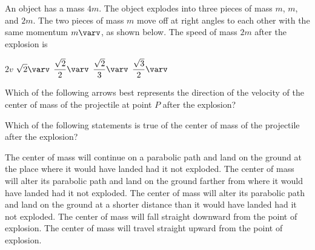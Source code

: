 \documentclass{../../oss-apphys-exam}
\begin{document}
\begin{multicols*}{2}
\begin{questions}
    \question An object has a mass $4m$. The object explodes into three pieces
    of mass $m$, $m$, and $2m$. The two pieces of mass $m$ move off at right
    angles to each other with the same momentum $m\varv$, as shown below. The
    speed of mass $2m$ after the explosion is
    \begin{center}
    \end{center}
    \vspace{-.2in}
    \begin{choices}
      \choice $2v$
      \choice $\displaystyle\sqrt{2}\varv$
      \choice $\dfrac{\sqrt{2}}{2}\varv$
      \choice $\dfrac{\sqrt{2}}{3}\varv$
      \choice $\dfrac{\sqrt{3}}{2}\varv$
    \end{choices}
    

    \question Which of the following arrows best represents the direction of the
    velocity of the center of mass of the projectile at point $P$ after the
    explosion?
    \label{cm1}
    \begin{choices}
      \choice{\LARGE$\leftarrow$}
      \choice{\LARGE$\swarrow$}
      \choice{\LARGE$\searrow$}
      \choice{\LARGE$\rightarrow$}
      \choice{\LARGE$\nearrow$}
    \end{choices}
    
    \question Which of the following statements is true of the center of mass
    of the projectile after the explosion?
    \label{cm2}
    \begin{choices}
      \choice The center of mass will continue on a parabolic path and land on
      the ground at the place where it would have landed had it not exploded.
      \choice The center of mass will alter its parabolic path and land on the
      ground farther from where it would have landed had it not exploded.
      \choice The center of mass will alter its parabolic path and land on the
      ground at a shorter distance than it would have landed had it not
      exploded.
      \choice The center of mass will fall straight downward from the point of
      explosion.
      \choice The center of mass will travel straight upward from the point of
      explosion.
    \end{choices}
    \columnbreak
    

\end{questions}
\end{multicols*}
\end{document}
